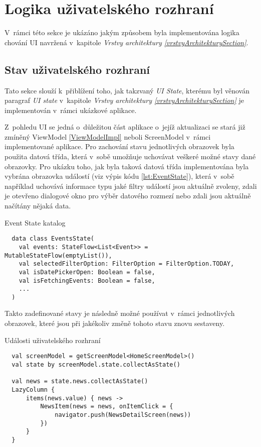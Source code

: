\section{Logika uživatelského rozhraní} \label{UILayerImpl}
V~rámci této sekce je ukázáno jakým způsobem byla implementována logika chování UI navržená v~kapitole 
\textit{Vrstvy architektury \ref{vrstvyArchitekturySection}}.



\subsection{Stav uživatelského rozhraní} \label{stateHandlingImpl}
Tato sekce slouží k~přiblížení toho, jak takzvaný \textit{UI State}, kterému byl věnován paragraf \textit{UI state}
v~kapitole \textit{Vrstvy architektury \ref{vrstvyArchitekturySection} } je implementován v~rámci ukázkové aplikace.

Z~pohledu UI se jedná o~důležitou část aplikace o~jejíž aktualizaci se stará již zmíněný ViewModel \ref{ViewModelImpl} neboli ScreenModel v~rámci
implementované aplikace. 
Pro zachování stavu jednotlivých obrazovek byla použita datová třída, která v~sobě umožňuje uchovávat veškeré možné stavy dané obrazovky.
Pro ukázku toho, jak byla taková datová třída implementována byla vybrána obrazovka událostí (viz výpis kódu \ref{lst:EventState}), která v~sobě 
například uchovává informace typu jaké filtry událostí jsou aktuálně zvoleny, zdali je otevřeno dialogové okno pro výběr datového rozmezí 
nebo zdali jsou aktuálně načítány nějaká data.
\begin{listing}[H]
\caption{Event State katalog}\label{lst:EventState}
\begin{verbatim}
  data class EventsState(
    val events: StateFlow<List<Event>> = MutableStateFlow(emptyList()),
    val selectedFilterOption: FilterOption = FilterOption.TODAY,
    val isDatePickerOpen: Boolean = false,
    val isFetchingEvents: Boolean = false,
    ...
  )
\end{verbatim}
\end{listing}

Takto zadefinované stavy je následně možné používat v~rámci jednotlivých obrazovek, které jsou při jakékoliv změně tohoto stavu znovu sestaveny.


\begin{listing}[H]
\caption{Události uživatelského rozhraní}\label{lst:StateImpl}
\begin{verbatim}
  val screenModel = getScreenModel<HomeScreenModel>()
  val state by screenModel.state.collectAsState()

  val news = state.news.collectAsState()
  LazyColumn {
      items(news.value) { news ->
          NewsItem(news = news, onItemClick = {
              navigator.push(NewsDetailScreen(news))
          })
      }
  }
\end{verbatim}
\end{listing}

